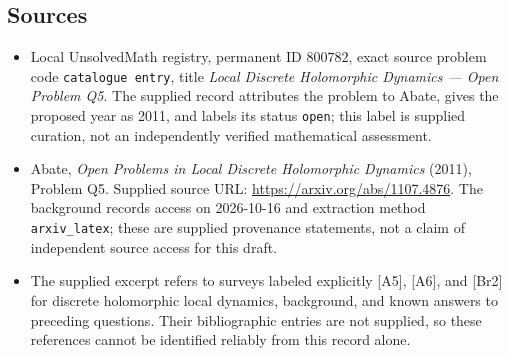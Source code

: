 \documentclass[11pt]{article}
\begin{document}
\subsection{Sources}
\begin{itemize}
\item Local UnsolvedMath registry, permanent ID \(800782\), exact source problem code \texttt{catalogue entry}, title \emph{Local Discrete Holomorphic Dynamics --- Open Problem Q5}. The supplied record attributes the problem to Abate, gives the proposed year as 2011, and labels its status \texttt{open}; this label is supplied curation, not an independently verified mathematical assessment.
\item Abate, \emph{Open Problems in Local Discrete Holomorphic Dynamics} (2011), Problem Q5. Supplied source URL: \url{https://arxiv.org/abs/1107.4876}. The background records access on 2026-10-16 and extraction method \texttt{arxiv\_latex}; these are supplied provenance statements, not a claim of independent source access for this draft.
\item The supplied excerpt refers to surveys labeled explicitly [A5], [A6], and [Br2] for discrete holomorphic local dynamics, background, and known answers to preceding questions. Their bibliographic entries are not supplied, so these references cannot be identified reliably from this record alone.
\end{itemize}
\end{document}
